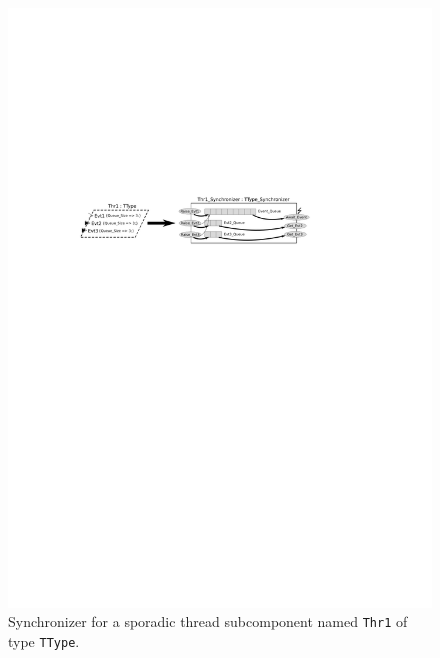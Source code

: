 \begin{figure}
\centering
\includegraphics[scale=1.4]{figs/synchronizer}
\caption{Synchronizer for a sporadic thread subcomponent named
  \texttt{Thr1} of type \texttt{TType}.}
\label{fig:synchronizer}
\end{figure}

